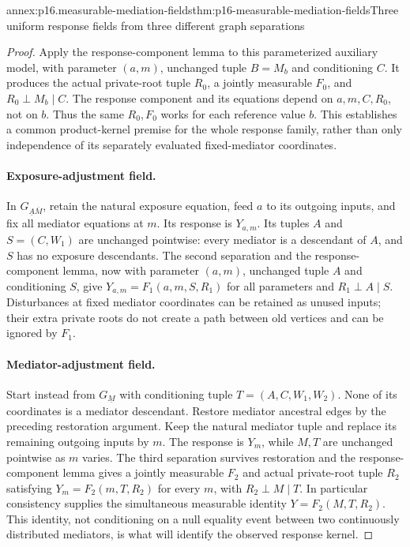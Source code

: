 \begin{annexitem}{annex:p16.measurable-mediation-fields}{thm:p16-measurable-mediation-fields}{Three uniform response fields from three different graph separations}
\begin{proof}
Apply the response-component lemma to this parameterized auxiliary
model, with parameter \((a,m)\), unchanged tuple \(B=M_b\) and
conditioning \(C\). It produces the actual private-root tuple \(R_0\),
a jointly measurable \(F_0\), and \(R_0\perp M_b\mid C\). The
response component and its equations depend on \(a,m,C,R_0\), not
on \(b\). Thus the same \(R_0,F_0\) works for each reference value
\(b\). This establishes a common product-kernel premise for the whole
response family, rather than only independence of its separately
evaluated fixed-mediator coordinates.

\paragraph{Exposure-adjustment field.}
In \(G_{\underline A\overline M}\), retain the natural exposure
equation, feed \(a\) to its outgoing inputs, and fix all mediator
equations at \(m\). Its response is \(Y_{a,m}\). Its tuples
\(A\) and \(S=(C,W_1)\) are unchanged pointwise: every mediator
is a descendant of \(A\), and \(S\) has no exposure descendants.
The second separation and the response-component lemma, now with
parameter \((a,m)\), unchanged tuple \(A\) and conditioning \(S\),
give \(Y_{a,m}=F_1(a,m,S,R_1)\) for all parameters and
\(R_1\perp A\mid S\). Disturbances at fixed mediator coordinates
can be retained as unused inputs; their extra private roots do not
create a path between old vertices and can be ignored by \(F_1\).

\paragraph{Mediator-adjustment field.}
Start instead from \(G_{\underline M}\) with conditioning tuple
\(T=(A,C,W_1,W_2)\). None of its coordinates is a mediator descendant.
Restore mediator ancestral edges by the preceding restoration argument.
Keep the natural mediator tuple and replace its remaining outgoing
inputs by \(m\). The response is \(Y_m\), while \(M,T\) are
unchanged pointwise as \(m\) varies. The third separation survives
restoration and the response-component lemma gives a jointly measurable
\(F_2\) and actual private-root tuple \(R_2\) satisfying
\(Y_m=F_2(m,T,R_2)\) for every \(m\), with \(R_2\perp M\mid T\).
In particular consistency supplies the simultaneous measurable identity
\(Y=F_2(M,T,R_2)\). This identity, not conditioning on a null equality
event between two continuously distributed mediators, is what will
identify the observed response kernel.


\end{proof}
\end{annexitem}
